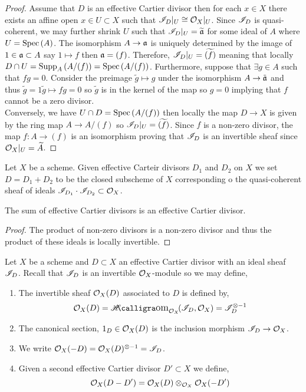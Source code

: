 \documentclass[12pt]{article}
\begin{document}
\begin{proof}
Assume that $D$ is an effective Cartier divisor then for each $x \in X$ there exists an affine open $x \in U \subset X$ such that $\mathscr{I}_D |_U \cong \mathcal{O}_{X} |_U$. Since $\mathscr{I}_D$ is quasi-coherent, we may further shrink $U$ such that $\mathscr{I}_D |_U = \widetilde{\mathfrak{a}}$ for some ideal of $A$ where $U = \mathrm{Spec}\left( A \right)$. The isomorphism $A \to \mathfrak{a}$ is uniquely determined by the image of $1 \in \mathfrak{a} \subset A$ say $1 \mapsto f$ then $\mathfrak{a} = (f)$. Therefore, $\mathscr{I}_D |_U = \widetilde{(f)}$ meaning that locally $D \cap U = \mathrm{Supp}_{A}\left(A / (f) \right) = \mathrm{Spec}\left( A / (f) \right)$. Furthermore, suppose that $\exists g \in A$ such that $fg = 0$. Consider the preimage $\tilde{g} \mapsto g$ under the isomorphism $A \to \tilde{\mathfrak{a}}$ and thus $\tilde{g} = 1 \tilde{g} \mapsto fg = 0$ so $\tilde{g}$ is in the kernel of the map so $g = 0$ implying that $f$ cannot be a zero divisor.
\bigskip\\
Conversely, we have $U \cap D = \mathrm{Spec}\left( A / (f) \right)$ then locally the map $D \to X$ is given by the ring map $A \to A / (f)$ so $\mathscr{I}_D |_U = \widetilde{(f)}$. Since $f$ is a non-zero divisor, the map $f : A \to (f)$ is an isomorphism proving that $\mathscr{I}_D$ is an invertible sheaf since $\mathcal{O}_{X}|_U = \widetilde{A}$. 
\end{proof}

\begin{definition}
Let $X$ be a scheme. Given effective Carteir divisors $D_1$ and $D_2$ on $X$ we set $D = D_1 + D_2$ to be the closed subscheme of $X$ corresponding o the quasi-coherent sheaf of ideals $\mathscr{I}_{D_1} \cdot \mathscr{I}_{D_2} \subset \mathcal{O}_{X}$. 
\end{definition}

\begin{proposition}
The sum of effective Cartier divisors is an effective Cartier divisor.
\end{proposition}

\begin{proof}
The product of non-zero divisors is a non-zero divisor and thus the product of these ideals is locally invertible.
\end{proof}

\begin{definition}
Let $X$ be a scheme and $D \subset X$ an effective Cartier divisor with an ideal sheaf $\mathscr{I}_D$. Recall that $\mathscr{I}_D$ is an invertible $\mathcal{O}_{X}$-module so we may define,
\begin{enumerate}
\item The invertible sheaf $\mathcal{O}_{X}(D)$ associated to $D$ is defined by,
\[ \struct{X}(D) = \shHomover{\struct{X}}{\I_D}{\struct{X}} = \I_D^{\otimes - 1} \]
\item The canonical section, $1_D \in \mathcal{O}_{X}(D)$ is the inclusion morphism $\mathscr{I}_D \to \mathcal{O}_{X}$. 
\item We write $\mathcal{O}_{X}(-D) = \mathcal{O}_{X}(D)^{\otimes -1} = \mathscr{I}_D$.
\item Given a second effective Cartier divisor $D' \subset X$ we define,
\[ \mathcal{O}_{X}(D - D') = \mathcal{O}_{X}(D) \otimes_{\mathcal{O}_{X}} \mathcal{O}_{X}(-D') \]
\end{enumerate}
\end{definition}
\end{document}
